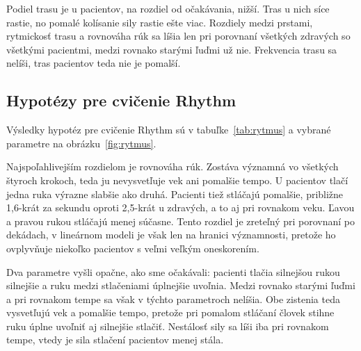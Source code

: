 \documentclass[12pt,a4paper]{article}
\begin{document}
Podiel trasu je u pacientov, na rozdiel od očakávania, nižší. Tras u nich síce rastie, no pomalé kolísanie sily
rastie ešte viac. Rozdiely medzi prstami, rytmickosť trasu a rovnováha rúk sa líšia len pri porovnaní všetkých
zdravých so všetkými pacientmi, medzi rovnako starými ľuďmi už nie. Frekvencia trasu sa nelíši, tras pacientov
teda nie je pomalší.

\subsection{Hypotézy pre cvičenie Rhythm}

Výsledky hypotéz pre cvičenie Rhythm sú v tabuľke~\ref{tab:rytmus} a vybrané parametre na obrázku~\ref{fig:rytmus}.

Najspoľahlivejším rozdielom je rovnováha rúk. Zostáva významná vo všetkých štyroch krokoch, teda ju nevysvetľuje vek
ani pomalšie tempo. U pacientov tlačí jedna ruka výrazne slabšie ako druhá. Pacienti tiež stláčajú pomalšie, približne
1,6-krát za sekundu oproti 2,5-krát u zdravých, a to aj pri rovnakom veku. Ľavou a pravou rukou stláčajú menej súčasne. Tento
rozdiel je zreteľný pri porovnaní po dekádach, v lineárnom modeli je však len na hranici významnosti, pretože ho
ovplyvňuje niekoľko pacientov s veľmi veľkým oneskorením.

Dva parametre vyšli opačne, ako sme očakávali: pacienti tlačia silnejšou rukou silnejšie a ruku medzi stlačeniami
úplnejšie uvoľnia. Medzi rovnako starými ľuďmi a pri rovnakom tempe sa však v týchto parametroch nelíšia. Obe
zistenia teda vysvetľujú vek a pomalšie tempo, pretože pri pomalom stláčaní človek stihne ruku úplne uvoľniť aj
silnejšie stlačiť. Nestálosť sily sa líši iba pri rovnakom tempe, vtedy je sila
stlačení pacientov menej stála.
\end{document}
